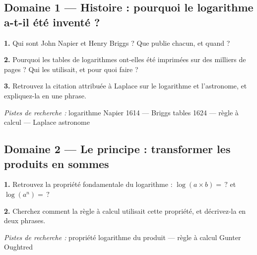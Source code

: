 \documentclass[11pt,a4paper]{article}
\newcommand{\champ}[1]{\makebox[#1]{\dotfill}}
\begin{document}
\subsection*{Domaine 1 --- Histoire : pourquoi le logarithme a-t-il été inventé ?}
\textbf{1.} Qui sont John Napier et Henry Briggs ? Que publie chacun, et quand ?
\par\smallskip
\textbf{2.} Pourquoi les tables de logarithmes ont-elles été imprimées sur des milliers de pages ? Qui les utilisait, et pour quoi faire ?
\par\smallskip
\textbf{3.} Retrouvez la citation attribuée à Laplace sur le logarithme et l'astronome, et expliquez-la en une phrase.
\par\smallskip
{\small\emph{Pistes de recherche :} logarithme Napier 1614 --- Briggs tables 1624 --- règle à calcul --- Laplace astronome}
\par\smallskip
\noindent\makebox[\linewidth]{\dotfill}\par\vspace{1em}
\noindent\makebox[\linewidth]{\dotfill}\par\vspace{1em}
\par\smallskip{\small Sources : \champ{0.96\linewidth}}\par\medskip
\subsection*{Domaine 2 --- Le principe : transformer les produits en sommes}
\textbf{1.} Retrouvez la propriété fondamentale du logarithme : $\log(a \times b) = \,?$ et $\log(a^{n}) = \,?$
\par\smallskip
\textbf{2.} Cherchez comment la règle à calcul utilisait cette propriété, et décrivez-la en deux phrases.
\par\smallskip
{\small\emph{Pistes de recherche :} propriété logarithme du produit --- règle à calcul Gunter Oughtred}
\par\smallskip
\noindent\makebox[\linewidth]{\dotfill}\par\vspace{1em}
\noindent\makebox[\linewidth]{\dotfill}\par\vspace{1em}
\par\smallskip{\small Sources : \champ{0.96\linewidth}}\par\medskip
\end{document}
